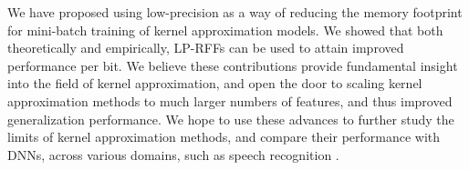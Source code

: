 We have proposed using low-precision as a way of reducing the memory footprint for mini-batch training of kernel approximation models. We showed that both theoretically and empirically, LP-RFFs can be used to attain improved performance per bit. We believe these contributions provide fundamental insight into the field of kernel approximation, and open the door to scaling kernel approximation methods to much larger numbers of features, and thus improved generalization performance. We hope to use these advances to further study the limits of kernel approximation methods, and compare their performance with DNNs, across various domains, such as speech recognition \citep{may2017}.

